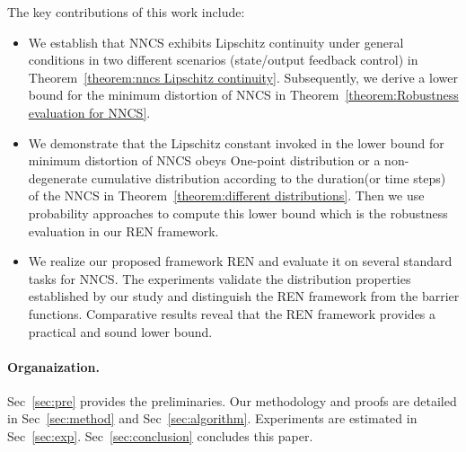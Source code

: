 \documentclass[conference]{IEEEtran}
\newcommand{\ren}{\textsc{REN}\xspace}
\newcommand{\nncs}{\textsc{NNCS}\xspace}
\newcommand{\roa}{\textsc{ROA}\xspace}
\newcommand{\ra}{\textsc{RA}\xspace}
\begin{document}

The key contributions of this work include:
\begin{itemize}
    \item 
    We establish 
    that \nncs exhibits Lipschitz continuity under 
    general conditions in two different scenarios
    (state/output feedback control) in Theorem~\ref{theorem:nncs Lipschitz continuity}. 
    Subsequently, we derive a lower bound for 
    the minimum distortion of \nncs in Theorem~\ref{theorem:Robustness evaluation for NNCS}. 
  
    \item 
    We demonstrate that the Lipschitz constant 
    invoked in the lower bound for 
    minimum distortion of \nncs obeys 
    One-point distribution or a non-degenerate cumulative distribution 
    according to the duration(or time steps) of the 
    \nncs in Theorem~\ref{theorem:different distributions}. 
    Then we use probability approaches 
    to compute this lower bound which 
    is the robustness evaluation 
    in our \ren framework. 
  
    \item 
    We realize our proposed framework \ren 
    and evaluate it on several 
    standard tasks for \nncs. 
    The experiments validate the distribution 
    properties established by our study and 
    distinguish the \ren framework from 
    the barrier functions. 
    Comparative results reveal that the 
    \ren framework provides a practical and sound 
    lower bound. 
    
  \end{itemize}

\paragraph{Organaization.}
Sec~\ref{sec:pre} provides the preliminaries. 
Our methodology and proofs are detailed in Sec~\ref{sec:method} 
and Sec~\ref{sec:algorithm}. 
Experiments are estimated in Sec~\ref{sec:exp}. 
Sec~\ref{sec:conclusion} concludes this paper. 
\end{document}
